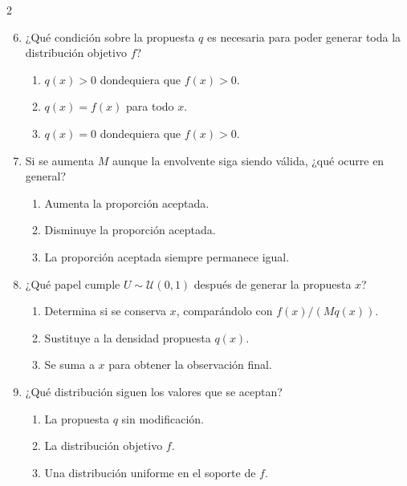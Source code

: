 \documentclass[11pt]{article}
\begin{document}
\newpage
\begingroup
\setlength{\parskip}{0pt}
\begin{multicols}{2}
\raggedright{}
\begin{enumerate}
    \setcounter{enumi}{5}
    \setlength{\itemsep}{0.7em}
    \item
    \begin{samepage}
    ¿Qué condición sobre la propuesta $q$ es necesaria para poder
    generar toda la distribución objetivo $f$?
    \begin{enumerate}
        \item $q(x)>0$ dondequiera que $f(x)>0$.
        \item $q(x)=f(x)$ para todo $x$.
        \item $q(x)=0$ dondequiera que $f(x)>0$.
    \end{enumerate}

\end{samepage}

    \item
    \begin{samepage}
    Si se aumenta $M$ aunque la envolvente siga siendo válida, ¿qué
    ocurre en general?
    \begin{enumerate}
        \item Aumenta la proporción aceptada.
        \item Disminuye la proporción aceptada.
        \item La proporción aceptada siempre permanece igual.
    \end{enumerate}

\end{samepage}

    \item
    \begin{samepage}
    ¿Qué papel cumple $U\sim\mathcal{U}(0,1)$ después de generar la
    propuesta $x$?
    \begin{enumerate}
        \item Determina si se conserva $x$, comparándolo con $f(x)/(Mq(x))$.
        \item Sustituye a la densidad propuesta $q(x)$.
        \item Se suma a $x$ para obtener la observación final.
    \end{enumerate}

\end{samepage}

    \item
    \begin{samepage}
    ¿Qué distribución siguen los valores que se aceptan?
    \begin{enumerate}
        \item La propuesta $q$ sin modificación.
        \item La distribución objetivo $f$.
        \item Una distribución uniforme en el soporte de $f$.
    \end{enumerate}
\end{samepage}
\end{enumerate}
\end{multicols}
\end{document}
